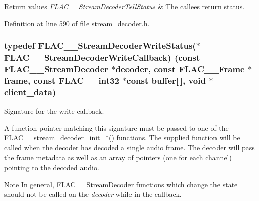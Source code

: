 \begin{DoxyRetVals}{Return values}
{\em F\+L\+A\+C\+\_\+\+\_\+\+Stream\+Decoder\+Tell\+Status} & The callee\textquotesingle{}s return status. \\
\hline
\end{DoxyRetVals}


Definition at line 590 of file stream\+\_\+decoder.\+h.

\subsubsection[{\texorpdfstring{F\+L\+A\+C\+\_\+\+\_\+\+Stream\+Decoder\+Write\+Callback}{FLAC__StreamDecoderWriteCallback}}]{\setlength{\rightskip}{0pt plus 5cm}typedef {\bf F\+L\+A\+C\+\_\+\+\_\+\+Stream\+Decoder\+Write\+Status}($\ast$ F\+L\+A\+C\+\_\+\+\_\+\+Stream\+Decoder\+Write\+Callback) ({\bf const} {\bf F\+L\+A\+C\+\_\+\+\_\+\+Stream\+Decoder} $\ast$decoder, {\bf const} {\bf F\+L\+A\+C\+\_\+\+\_\+\+Frame} $\ast$frame, {\bf const} {\bf F\+L\+A\+C\+\_\+\+\_\+int32} $\ast${\bf const} {\bf buffer}\mbox{[}$\,$\mbox{]}, {\bf void} $\ast$client\+\_\+data)}\hypertarget{group__flac__stream__decoder_ga61e48dc2c0d2f6c5519290ff046874a4}{}\label{group__flac__stream__decoder_ga61e48dc2c0d2f6c5519290ff046874a4}
Signature for the write callback.

A function pointer matching this signature must be passed to one of the F\+L\+A\+C\+\_\+\+\_\+stream\+\_\+decoder\+\_\+init\+\_\+$\ast$() functions. The supplied function will be called when the decoder has decoded a single audio frame. The decoder will pass the frame metadata as well as an array of pointers (one for each channel) pointing to the decoded audio.

\begin{DoxyNote}{Note}
In general, \hyperlink{struct_f_l_a_c_____stream_decoder}{F\+L\+A\+C\+\_\+\+\_\+\+Stream\+Decoder} functions which change the state should not be called on the {\itshape decoder} while in the callback.
\end{DoxyNote}

